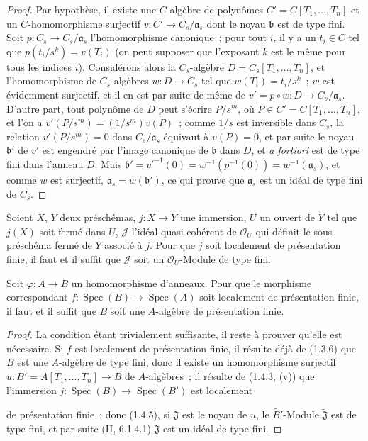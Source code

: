 \begin{proof}
Par hypothèse, il existe une $C$-algèbre de polynômes
$C'=C[T_1,\ldots,T_n]$ et un $C$-homomorphisme surjectif
$v:C'\to C_s/\mathfrak a_s$ dont le noyau $\mathfrak b$ est de type fini.
Soit $p:C_s\to C_s/\mathfrak a_s$ l'homomorphisme canonique~; pour tout $i$,
il y a un $t_i\in C$ tel que $p(t_i/s^k)=v(T_i)$ (on peut supposer que
l'exposant $k$ est le même pour tous les indices $i$). Considérons alors la
$C_s$-algèbre $D=C_s[T_1,\ldots,T_n]$, et l'homomorphisme de $C_s$-algèbres
$w:D\to C_s$ tel que $w(T_i)=t_i/s^k$~; $w$ est évidemment surjectif, et il
en est par suite de même de $v'=p\circ w:D\to C_s/\mathfrak a_s$. D'autre
part, tout polynôme de $D$ peut s'écrire $P/s^m$, où
$P\in C'=C[T_1,\ldots,T_n]$, et l'on a
$v'(P/s^m)=(1/s^m)v(P)$~; comme $1/s$ est inversible dans $C_s$, la relation
$v'(P/s^m)=0$ dans $C_s/\mathfrak a_s$ équivaut à $v(P)=0$, et par suite le
noyau $\mathfrak b'$ de $v'$ est engendré par l'image canonique de
$\mathfrak b$ dans $D$, et \emph{a fortiori} est de type fini dans l'anneau
$D$. Mais
$\mathfrak b'=v'^{-1}(0)=w^{-1}(p^{-1}(0))=w^{-1}(\mathfrak a_s)$, et comme
$w$ est surjectif, $\mathfrak a_s=w(\mathfrak b')$, ce qui prouve que
$\mathfrak a_s$ est un idéal de type fini de $C_s$.
\end{proof}

\begin{corollary}[1.4.5]
\label{IV.1.4.5-fr}
Soient $X$, $Y$ deux préschémas, $j:X\to Y$ une immersion, $U$ un ouvert de
$Y$ tel que $j(X)$ soit fermé dans $U$, $\mathcal J$ l'idéal quasi-cohérent de
$\mathcal O_U$ qui définit le sous-préschéma fermé de $Y$ associé à $j$. Pour
que $j$ soit localement de présentation finie, il faut et il suffit que
$\mathcal J$ soit un $\mathcal O_U$-Module de type fini.
\end{corollary}

\par\medskip\noindent
\begin{proposition}[1.4.6]
\label{IV.1.4.6-fr}
Soit $\varphi:A\to B$ un homomorphisme d'anneaux. Pour que le morphisme
correspondant $f:\operatorname{Spec}(B)\to\operatorname{Spec}(A)$ soit localement de présentation finie,
il faut et il suffit que $B$ soit une $A$-algèbre de présentation finie.
\end{proposition}

\begin{proof}
La condition étant trivialement suffisante, il reste à prouver qu'elle est
nécessaire. Si $f$ est localement de présentation finie, il résulte déjà de
(1.3.6) que $B$ est une $A$-algèbre de type fini, donc il existe un
homomorphisme surjectif $u:B'=A[T_1,\ldots,T_n]\to B$ de $A$-algèbres~; il
résulte de (1.4.3, (v)) que l'immersion
$j:\operatorname{Spec}(B)\to\operatorname{Spec}(B')$ est localement


de présentation finie~; donc (1.4.5), si $\mathfrak J$ est le noyau de $u$,
le $\widetilde{B'}$-Module $\widetilde{\mathfrak J}$ est de type fini, et par
suite (II, 6.1.4.1) $\mathfrak J$ est un idéal de type fini.
\end{proof}

